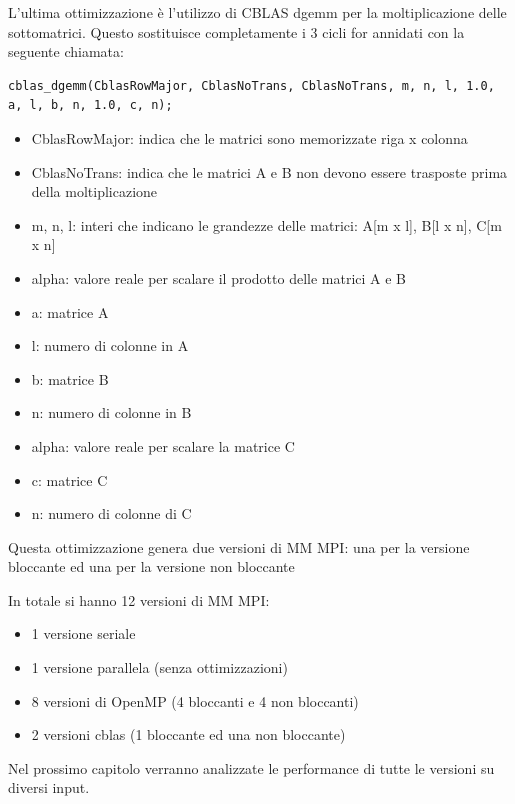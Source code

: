 L'ultima ottimizzazione \`{e} l'utilizzo di CBLAS dgemm per la moltiplicazione delle sottomatrici. Questo sostituisce completamente i 3 cicli for annidati con la seguente chiamata:

\begin{lstlisting}
cblas_dgemm(CblasRowMajor, CblasNoTrans, CblasNoTrans, m, n, l, 1.0, a, l, b, n, 1.0, c, n);
\end{lstlisting}

\begin{itemize}
  \item CblasRowMajor: indica che le matrici sono memorizzate riga x colonna
  \item CblasNoTrans: indica che le matrici A e B non devono essere trasposte prima della moltiplicazione
  \item m, n, l: interi che indicano le grandezze delle matrici: A[m x l], B[l x n], C[m x n]
  \item alpha: valore reale per scalare il prodotto delle matrici A e B
  \item a: matrice A
  \item l: numero di colonne in A
  \item b: matrice B
  \item n: numero di colonne in B
  \item alpha: valore reale per scalare la matrice C
  \item c: matrice C
  \item n: numero di colonne di C
\end{itemize}

Questa ottimizzazione genera due versioni di MM MPI: una per la versione bloccante ed una per la versione non bloccante


In totale si hanno 12 versioni di MM MPI:
\begin{itemize}
    \item 1 versione seriale
    \item 1 versione parallela (senza ottimizzazioni)
    \item 8 versioni di OpenMP (4 bloccanti e 4 non bloccanti)
    \item 2 versioni cblas (1 bloccante ed una non bloccante)
\end{itemize}

Nel prossimo capitolo verranno analizzate le performance di tutte le versioni su diversi input.
